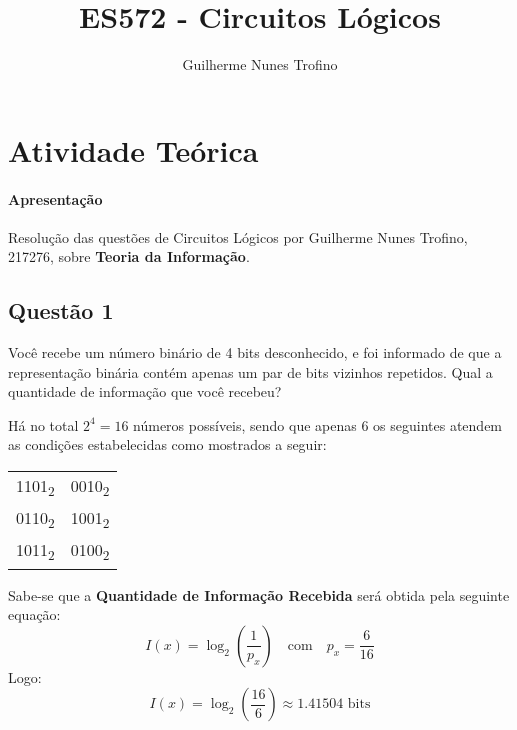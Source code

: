 \documentclass{article}
\title{ES572 - Circuitos Lógicos}
\author{Guilherme Nunes Trofino}
\begin{document}
    \maketitle
\newpage

    \section{Atividade Teórica}
        \paragraph{Apresentação}Resolução das questões de Circuitos Lógicos por Guilherme Nunes Trofino, 217276, sobre \textbf{Teoria da Informação}.

        \subsection{Questão 1}
            \begin{exercise}
                Você recebe um número binário de 4 bits desconhecido, e foi informado de que a representação binária contém apenas um par de bits vizinhos repetidos. Qual a quantidade de informação que você recebeu?
            \end{exercise}
            \begin{resolution}
                Há no total $2^{4} = 16$ números possíveis, sendo que apenas $6$ os seguintes atendem as condições estabelecidas como mostrados a seguir:
                    \begin{table}[H]
                        \centering
                        \begin{tabular}[]{cc}\hline
                            1101\textsubscript{2} & 0010\textsubscript{2}\\
                            0110\textsubscript{2} & 1001\textsubscript{2}\\
                            1011\textsubscript{2} & 0100\textsubscript{2}\\\hline
                        \end{tabular}
                    \end{table}\noindent
                Sabe-se que a \textbf{Quantidade de Informação Recebida} será obtida pela seguinte equação:
                    \begin{equation*}
                        I(x) = \log_{2}\left(\frac{1}{p_{x}}\right)
                        \quad\text{com}\quad
                        p_{x} = \frac{6}{16}
                    \end{equation*}
                Logo:
                    \begin{equation*}
                        I(x) = \log_{2}\left(\frac{16}{6}\right) \approx \boxed{1.41504 \text{ bits}}
                    \end{equation*}
            \end{resolution}
\end{document}
